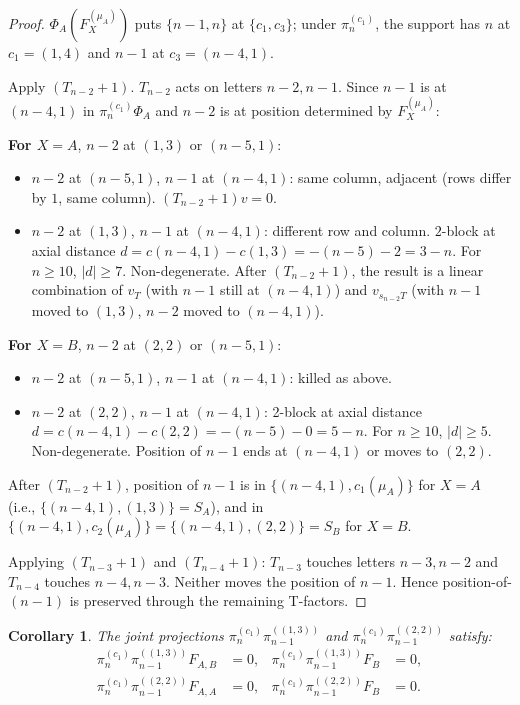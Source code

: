 \documentclass[11pt]{article}
\newtheorem{corollary}[theorem]{Corollary}
\theoremstyle{definition}
\begin{document}
\begin{proof}
$\Phi_A(F_X^{(\mu_A)})$ puts $\{n-1, n\}$ at $\{c_1, c_3\}$; under
$\pi^{(c_1)}_n$, the support has $n$ at $c_1 = (1, 4)$ and
$n - 1$ at $c_3 = (n-4, 1)$.

Apply $(T_{n-2}{+}1)$. $T_{n-2}$ acts on letters $n-2, n-1$. Since
$n-1$ is at $(n-4, 1)$ in $\pi^{(c_1)}_n \Phi_A$ and $n-2$ is at
position determined by $F_X^{(\mu_A)}$:

\noindent\textbf{For $X = A$}, $n-2$ at $(1, 3)$ or $(n-5, 1)$:
\begin{itemize}[leftmargin=2em,topsep=0.3em,itemsep=0.2em]
\item $n-2$ at $(n-5, 1)$, $n-1$ at $(n-4, 1)$: same column,
adjacent (rows differ by $1$, same column). $(T_{n-2}{+}1) v = 0$.
\item $n-2$ at $(1, 3)$, $n-1$ at $(n-4, 1)$: different row and
column. $2$-block at axial distance $d = c(n-4, 1) - c(1, 3) =
-(n-5) - 2 = 3 - n$. For $n \ge 10$, $|d| \ge 7$. Non-degenerate.
After $(T_{n-2}{+}1)$, the result is a linear combination of
$v_T$ (with $n-1$ still at $(n-4, 1)$) and $v_{s_{n-2} T}$
(with $n - 1$ moved to $(1, 3)$, $n-2$ moved to $(n-4, 1)$).
\end{itemize}
\noindent\textbf{For $X = B$}, $n-2$ at $(2, 2)$ or $(n-5, 1)$:
\begin{itemize}[leftmargin=2em,topsep=0.3em,itemsep=0.2em]
\item $n-2$ at $(n-5, 1)$, $n-1$ at $(n-4, 1)$: killed as above.
\item $n-2$ at $(2, 2)$, $n-1$ at $(n-4, 1)$: 2-block at axial
distance $d = c(n-4, 1) - c(2, 2) = -(n-5) - 0 = 5 - n$. For
$n \ge 10$, $|d| \ge 5$. Non-degenerate. Position of $n-1$ ends
at $(n-4, 1)$ or moves to $(2, 2)$.
\end{itemize}

After $(T_{n-2}{+}1)$, position of $n-1$ is in $\{(n-4, 1), c_1(\mu_A)\}$
for $X = A$ (i.e., $\{(n-4, 1), (1, 3)\} = S_A$), and in
$\{(n-4, 1), c_2(\mu_A)\} = \{(n-4, 1), (2, 2)\} = S_B$ for $X = B$.

Applying $(T_{n-3}{+}1)$ and $(T_{n-4}{+}1)$: $T_{n-3}$ touches
letters $n-3, n-2$ and $T_{n-4}$ touches $n-4, n-3$. Neither moves
the position of $n - 1$. Hence position-of-$(n-1)$ is preserved
through the remaining T-factors.\qedhere
\end{proof}

\begin{corollary}\label{cor:separate-AA-AB}
The joint projections $\pi^{(c_1)}_n \pi^{((1, 3))}_{n-1}$ and
$\pi^{(c_1)}_n \pi^{((2, 2))}_{n-1}$ satisfy:
\begin{align*}
   \pi^{(c_1)}_n \pi^{((1, 3))}_{n-1} F_{A,B} &= 0, &
   \pi^{(c_1)}_n \pi^{((1, 3))}_{n-1} F_B &= 0,\\
   \pi^{(c_1)}_n \pi^{((2, 2))}_{n-1} F_{A,A} &= 0, &
   \pi^{(c_1)}_n \pi^{((2, 2))}_{n-1} F_B &= 0.
\end{align*}
\end{corollary}
\end{document}
